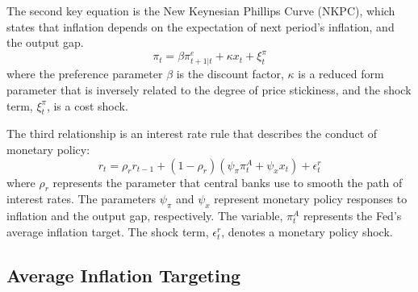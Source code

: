 \documentclass[english,authoryear,12pt]{elsarticle}
\begin{document}
The second key equation is the New Keynesian Phillips Curve (NKPC), which states that inflation depends on the expectation of next period's inflation, and the output gap.
\begin{equation}\label{eq:PhillipsCurvee}
	\pi_t = \beta \pi_{t+1|t}^e + \kappa x_t + \xi_t^{\pi}
\end{equation}
where the preference parameter $\beta$ is the discount factor, $\kappa$ is a reduced form parameter that is inversely related to the degree of price stickiness, and the shock term, $\xi_t^\pi$, is a cost shock.

The third relationship is an interest rate rule that describes the conduct of monetary policy:
\begin{equation}\label{eq:TaylorRule}
	r_t = \rho_r r_{t-1} + (1-\rho_r) \left( \psi_\pi \pi_t^A + \psi_x x_t \right) + \epsilon_t^{r}
\end{equation}
where $\rho_r$ represents the parameter that central banks use to smooth the path of interest rates. The parameters $\psi_\pi$ and $\psi_x$ represent monetary policy responses to inflation and the output gap, respectively. The variable, $\pi_t^A$ represents the Fed's average inflation target. The shock term, $\epsilon_t^r$, denotes a monetary policy shock.

\subsection{Average Inflation Targeting}
\end{document}

